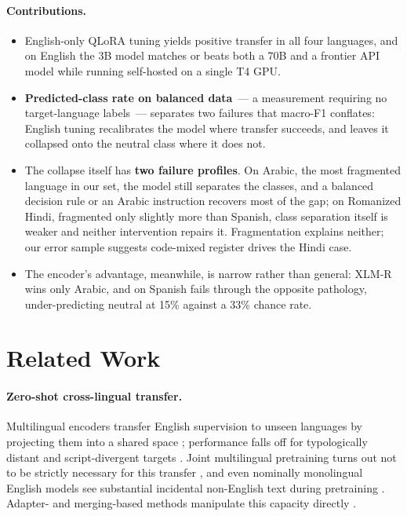 \documentclass[11pt]{article}
\begin{document}
\paragraph{Contributions.}
\begin{itemize}\itemsep2pt
\item English-only QLoRA tuning yields positive transfer in all four languages,
  and on English the 3B model matches or beats both a 70B and a frontier API model
  while running self-hosted on a single T4 GPU.
\item \textbf{Predicted-class rate on balanced data}~--- a measurement requiring
  no target-language labels~--- separates two failures that macro-F1 conflates:
  English tuning recalibrates the model where transfer succeeds, and leaves it
  collapsed onto the neutral class where it does not.
\item The collapse itself has \textbf{two failure profiles}. On Arabic, the most
  fragmented language in our set, the model still separates the classes, and a
  balanced decision rule or an Arabic instruction recovers most of the gap; on
  Romanized Hindi, fragmented only slightly more than Spanish, class separation
  itself is weaker and neither intervention repairs it. Fragmentation explains
  neither; our error sample suggests code-mixed register drives the Hindi case.
\item The encoder's advantage, meanwhile, is narrow rather than general: \mbox{XLM-R}
  wins only Arabic, and on Spanish fails through the opposite pathology,
  under-predicting neutral at 15\% against a 33\% chance rate.
\end{itemize}

\section{Related Work}
\label{sec:related_work}

\paragraph{Zero-shot cross-lingual transfer.}
Multilingual encoders transfer English supervision to unseen languages by
projecting them into a shared space \citep{devlin2019bert,conneau2020xlmr};
performance falls off for typologically distant and script-divergent targets
\citep{pires2019multilingual,wu2019beto,karthikeyan2020cross,hu2020xtreme}. Joint
multilingual pretraining turns out not to be strictly necessary for this transfer
\citep{artetxe2020cross}, and even nominally monolingual English models see
substantial incidental non-English text during pretraining
\citep{blevins2022contamination}. Adapter- and merging-based methods manipulate
this capacity directly \citep{pfeiffer2020madx,bandarkar2025merging}.
\end{document}
